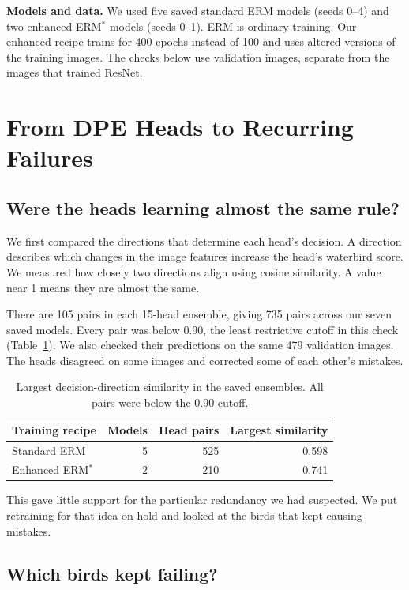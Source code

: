 \documentclass[runningheads]{llncs}
\begin{document}
\textbf{Models and data.} We used five saved standard ERM models
(seeds 0--4) and two enhanced ERM$^*$ models (seeds 0--1). ERM is ordinary
training. Our enhanced recipe trains for 400 epochs instead of 100
and uses altered versions of the training images. The checks below use
validation images, separate from the images that trained ResNet.

\newpage
\section{From DPE Heads to Recurring Failures}

\subsection{Were the heads learning almost the same rule?}

We first compared the directions that determine each head's decision.
A direction describes which changes in the image features increase
the head's waterbird score. We measured how closely two directions
align using cosine similarity. A value near 1 means they are almost
the same.

There are 105 pairs in each 15-head ensemble, giving 735 pairs across
our seven saved models. Every pair was below 0.90, the least restrictive
cutoff in this check (Table~\ref{tab:heads}). We also checked their
predictions on the same 479 validation images. The heads disagreed
on some images and corrected some of each other's mistakes.

\begin{table}[H]
\centering
\caption{Largest decision-direction similarity in the saved ensembles.
All pairs were below the 0.90 cutoff.}
\label{tab:heads}
\small
\begin{tabular}{@{}lrrr@{}}
\toprule
Training recipe & Models & Head pairs & Largest similarity\\
\midrule
Standard ERM & 5 & 525 & 0.598\\
Enhanced ERM$^*$ & 2 & 210 & 0.741\\
\bottomrule
\end{tabular}
\end{table}

This gave little support for the particular redundancy we had suspected.
We put retraining for that idea on hold and looked at the birds that
kept causing mistakes.

\subsection{Which birds kept failing?}
\end{document}
